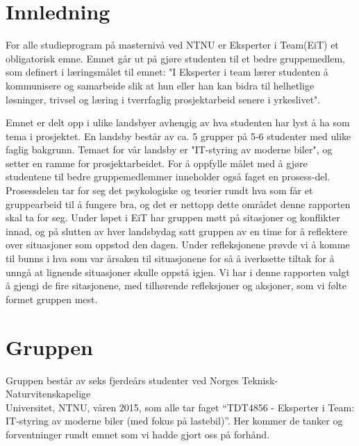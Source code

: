 \chapter{Innledning}

For alle studieprogram på masternivå ved NTNU er Eksperter i Team(EiT) et obligatorisk emne. Emnet går ut på gjøre 
studenten til et bedre gruppemedlem, som definert i læringsmålet til emnet: "I Eksperter i team lærer studenten å 
kommunisere og samarbeide slik at hun eller han kan
bidra til helhetlige løsninger, trivsel og læring i tverrfaglig prosjektarbeid senere i yrkeslivet". 

Emnet er delt opp i ulike landsbyer avhengig av hva studenten har lyst å ha som tema i prosjektet. En landsby består 
av ca. 5 grupper på 5-6 studenter med ulike faglig bakgrunn. Temaet for vår landsby er "IT-styring av moderne 
biler", og setter en ramme for prosjektarbeidet. For å oppfylle målet med å gjøre studentene til bedre gruppemedlemmer 
inneholder også faget en prosess-del. Prosessdelen tar for seg det psykologiske og teorier rundt hva som får 
et gruppearbeid til å fungere bra, og det er nettopp dette området denne rapporten skal ta for seg. 
Under løpet i EiT har gruppen møtt på sitasjoner og konflikter innad, og på slutten av 
hver landsbydag satt gruppen av en time for å reflektere over situasjoner som oppstod den dagen. Under refleksjonene 
prøvde vi å komme til bunns i hva som var årsaken til situasjonene for så å iverksette tiltak for å unngå 
at lignende situasjoner skulle oppstå igjen. Vi har i denne rapporten valgt å gjengi de fire sitasjonene, med tilhørende 
refleksjoner og aksjoner, som vi følte formet gruppen mest.





\chapter{Gruppen} 
Gruppen består av seks fjerdeårs studenter ved Norges Teknisk-
Naturvitenskapelige\\Universitet, NTNU, våren 2015, som alle tar faget ``TDT4856 
- Eksperter i Team: IT-styring av moderne biler (med fokus på lastebil)''.	 Her kommer de tanker og forventninger
rundt emnet som vi hadde gjort oss på forhånd.


